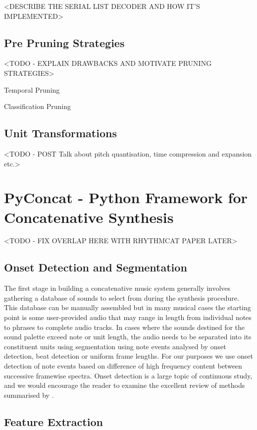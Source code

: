 {{{{{{{<DESCRIBE THE SERIAL LIST DECODER AND HOW IT’S IMPLEMENTED>
 
\subsection{Pre Pruning Strategies}

<TODO - EXPLAIN DRAWBACKS AND MOTIVATE PRUNING STRATEGIES>

Temporal Pruning 

Classification Pruning

\subsection{Unit Transformations}
<TODO - POST Talk about pitch quantisation, time compression and expansion etc.>

\section{PyConcat - Python Framework for Concatenative Synthesis}

<TODO - FIX OVERLAP HERE WITH RHYTHMCAT PAPER LATER>

\subsection{Onset Detection and Segmentation}

The first stage in building a concatenative music system generally involves gathering a database of sounds to select from during the synthesis procedure. This database can be manually assembled but in many musical cases the starting point is some user-provided audio that may range in length from individual notes to phrases to complete audio tracks. In cases where the sounds destined for the sound palette exceed note or unit length, the audio needs to be separated into its constituent units using segmentation using note events analysed by onset detection, beat detection or uniform frame lengths. For our purposes we use onset detection of note events based on difference of high frequency content between successive framewise spectra. Onset detection is a large topic of continuous study, and we would encourage the reader to examine the excellent review of methods summarised by \cite{Bello2005}.

\subsection{Feature Extraction}

}}}}}}}

